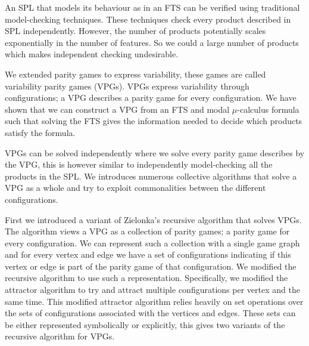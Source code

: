 An SPL that models its behaviour as in an FTS can be verified using traditional model-checking techniques. These techniques check every product described in SPL independently. However, the number of products potentially scales exponentially in the number of features. So we could a large number of products which makes independent checking undesirable.

We extended parity games to express variability, these games are called variability parity games (VPGs). VPGs express variability through configurations; a VPG describes a parity game for every configuration. We have shown that we can construct a VPG from an FTS and modal $\mu$-calculus formula such that solving the FTS gives the information needed to decide which products satisfy the formula.

VPGs can be solved independently where we solve every parity game describes by the VPG, this is however similar to independently model-checking all the products in the SPL. We introduces numerous collective algorithms that solve a VPG as a whole and try to exploit commonalities between the different configurations.

First we introduced a variant of Zielonka's recursive algorithm that solves VPGs. The algorithm views a VPG as a collection of parity games; a parity game for every configuration. We can represent such a collection with a single game graph and for every vertex and edge we have a set of configurations indicating if this vertex or edge is part of the parity game of that configuration. We modified the recursive algorithm to use such a representation. Specifically, we modified the attractor algorithm to try and attract multiple configurations per vertex and the same time. This modified attractor algorithm relies heavily on set operations over the sets of configurations associated with the vertices and edges. These sets can be either represented symbolically or explicitly, this gives two variants of the recursive algorithm for VPGs.

